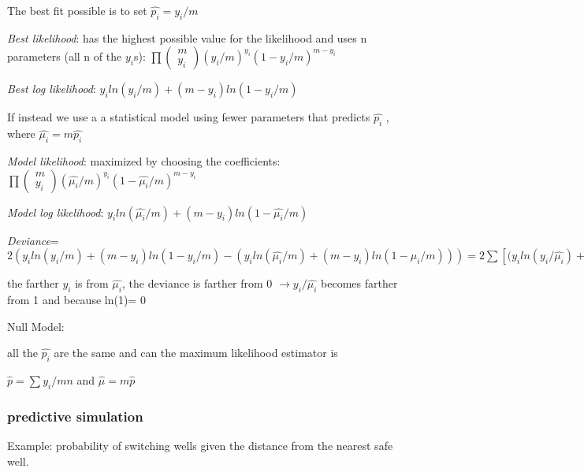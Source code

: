 \documentclass[
]{article}
\begin{document}
The best fit possible is to set \(\hat{p_{i}} = y_{i}/m\)

\emph{Best likelihood}: has the highest possible value for the
likelihood and uses n parameters (all n of the \(y_{i}\)s):
\(\prod\begin{pmatrix} m \\y_{i} \end{pmatrix} (y_{i}/m)^{y_{i}} (1-y_{i}/m)^{m-y_{i}}\)

\emph{Best log likelihood}:
\(y_{i} ln(y_{i}/m) +(m-y_{i})ln (1-y_{i}/m)\)

If instead we use a a statistical model using fewer parameters that
predicts \(\hat{p_{i}}\) , where \(\hat{\mu_{i}}=m \hat{p_{i}}\)

\emph{Model likelihood}: maximized by choosing the coefficients:
\(\prod\begin{pmatrix} m \\y_{i} \end{pmatrix} (\hat{\mu_{i}}/m)^{y_{i}} (1-\hat{\mu_{i}}/m)^{m-y_{i}}\)

\emph{Model log likelihood}:
\(y_{i} ln(\hat{\mu_{i}}/m) +(m-y_{i})ln (1-\hat{\mu_{i}}/m)\)

\emph{Deviance}=
\(2(y_{i} ln(y_{i}/m) +(m-y_{i})ln (1-y_{i}/m) - (y_{i} ln(\hat{\mu_{i}}/m) +(m-y_{i})ln (1-\hat{\mu_{i}}/m)) ) = 2\sum[(y_{i} ln(y_{i}/\hat{\mu_{i}}) + (m-y_{i})ln((m- y_{i})/(m- \hat{\mu_{i}}))]\)

the farther \(y_{i}\) is from \(\hat{\mu_{i}}\), the deviance is farther
from 0 \(\rightarrow y_{i}/\hat{\mu_{i}}\) becomes farther from 1 and
because ln(1)= 0

Null Model:

all the \(\hat{p_{i}}\) are the same and can the maximum likelihood
estimator is

\(\hat{p}= \sum y_{i}/mn\) and \(\hat{\mu}= m\hat{p}\)

\hypertarget{predictive-simulation}{%
\subsubsection{predictive simulation}\label{predictive-simulation}}

Example: probability of switching wells given the distance from the
nearest safe well.
\end{document}
